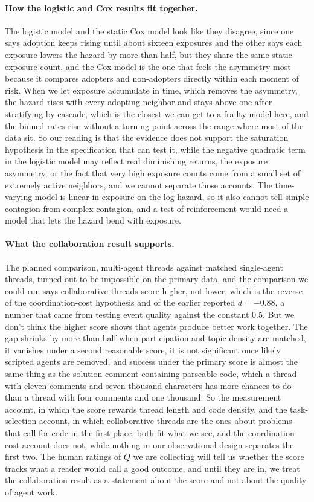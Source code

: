 \documentclass{article}
\begin{document}
\paragraph{How the logistic and Cox results fit together.}
The logistic model and the static Cox model look like they disagree, since one says adoption keeps rising until about sixteen exposures and the other says each exposure lowers the hazard by more than half, but they share the same static exposure count, and the Cox model is the one that feels the asymmetry most because it compares adopters and non-adopters directly within each moment of risk. When we let exposure accumulate in time, which removes the asymmetry, the hazard rises with every adopting neighbor and stays above one after stratifying by cascade, which is the closest we can get to a frailty model here, and the binned rates rise without a turning point across the range where most of the data sit. So our reading is that the evidence does not support the saturation hypothesis in the specification that can test it, while the negative quadratic term in the logistic model may reflect real diminishing returns, the exposure asymmetry, or the fact that very high exposure counts come from a small set of extremely active neighbors, and we cannot separate those accounts. The time-varying model is linear in exposure on the log hazard, so it also cannot tell simple contagion from complex contagion, and a test of reinforcement would need a model that lets the hazard bend with exposure.

\paragraph{What the collaboration result supports.}
The planned comparison, multi-agent threads against matched single-agent threads, turned out to be impossible on the primary data, and the comparison we could run says collaborative threads score higher, not lower, which is the reverse of the coordination-cost hypothesis and of the earlier reported $d = -0.88$, a number that came from testing event quality against the constant 0.5. But we don't think the higher score shows that agents produce better work together. The gap shrinks by more than half when participation and topic density are matched, it vanishes under a second reasonable score, it is not significant once likely scripted agents are removed, and success under the primary score is almost the same thing as the solution comment containing parseable code, which a thread with eleven comments and seven thousand characters has more chances to do than a thread with four comments and one thousand. So the measurement account, in which the score rewards thread length and code density, and the task-selection account, in which collaborative threads are the ones about problems that call for code in the first place, both fit what we see, and the coordination-cost account does not, while nothing in our observational design separates the first two. The human ratings of $Q$ we are collecting will tell us whether the score tracks what a reader would call a good outcome, and until they are in, we treat the collaboration result as a statement about the score and not about the quality of agent work.
\end{document}
